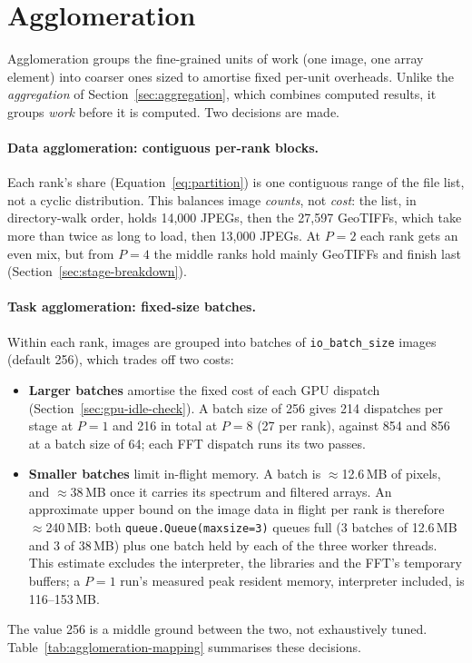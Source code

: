 \documentclass[a4paper,12pt]{report}
\begin{document}
\section{Agglomeration}
\label{sec:agglomeration}

Agglomeration groups the fine-grained units of work (one image, one array element)
into coarser ones sized to amortise fixed per-unit overheads. Unlike the
\emph{aggregation} of Section~\ref{sec:aggregation}, which combines computed
results, it groups \emph{work} before it is computed. Two decisions are made.

\paragraph{Data agglomeration: contiguous per-rank blocks.}
Each rank's share (Equation~\eqref{eq:partition}) is one contiguous range of the
file list, not a cyclic distribution. This balances image \emph{counts}, not
\emph{cost}: the list, in directory-walk order, holds 14{,}000
JPEGs, then the 27{,}597 GeoTIFFs, which take more than twice as long to
load, then 13{,}000 JPEGs. At $P=2$ each rank gets an even mix, but from
$P=4$ the middle ranks hold mainly GeoTIFFs and finish last
(Section~\ref{sec:stage-breakdown}).

\paragraph{Task agglomeration: fixed-size batches.}
Within each rank, images are grouped into batches of
\texttt{io\_\discretionary{}{}{}batch\_\discretionary{}{}{}size} images (default 256), which trades off two costs:
\begin{itemize}[noitemsep]
  \item \textbf{Larger batches} amortise the fixed cost of each GPU
    dispatch (Section~\ref{sec:gpu-idle-check}). A batch size of 256 gives 214 dispatches per stage at $P=1$ and
    216 in total at $P=8$ (27 per rank), against 854 and 856 at a batch size of
    64; each FFT dispatch runs its two passes.
  \item \textbf{Smaller batches} limit in-flight memory. A batch is $\approx$12.6\,MB of pixels, and
    $\approx$38\,MB once it carries its spectrum and filtered arrays. An
    approximate upper bound on the image data in flight per rank is therefore
    $\approx$240\,MB: both \texttt{queue.Queue(maxsize=3)} queues full (3 batches
    of 12.6\,MB and 3 of 38\,MB) plus one batch held by each of the three worker
    threads. This estimate excludes the interpreter, the libraries and the FFT's
    temporary buffers; a $P=1$ run's measured peak resident memory, interpreter
    included, is 116--153\,MB.
\end{itemize}
The value 256 is a middle ground between the two, not exhaustively tuned.
Table~\ref{tab:agglomeration-mapping} summarises these decisions.
\end{document}
